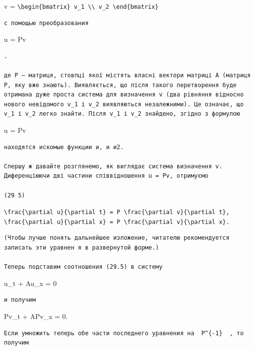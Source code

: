 \documentclass[
  ukrainian,
]{article}
\begin{document}
v =
\texttt{\textbackslash{}begin\{bmatrix\}\ v\_1\ \textbackslash{}\textbackslash{}\ v\_2\ \textbackslash{}end\{bmatrix\}}

\begin{verbatim}
с помощью преобразования
\end{verbatim}

u = Pv

\begin{verbatim}
.

де P — матриця, стовпці якої містять власні вектори матриці A (матриця P, яку вже знають). Виявляється, що після такого перетворення буде отримана дуже проста система для визначення v (два рівняння відносно нового невідомого v_1 і v_2 виявляються незалежними). Це означає, що v_1 і v_2 легко знайти. Після v_1 і v_2 знайдено, згідно з формулою
\end{verbatim}

u = Pv

\begin{verbatim}
находятся искомые функции и, и и2.

Спершу ж давайте розглянемо, як виглядає система визначення v. Диференціюючи дві частини співвідношення u = Pv, отримуємо

(29 5)
\end{verbatim}

\texttt{\textbackslash{}frac\{\textbackslash{}partial\ u\}\{\textbackslash{}partial\ t\}\ =\ P\ \textbackslash{}frac\{\textbackslash{}partial\ v\}\{\textbackslash{}partial\ t\},}
\texttt{\textbackslash{}frac\{\textbackslash{}partial\ u\}\{\textbackslash{}partial\ x\}\ =\ P\ \textbackslash{}frac\{\textbackslash{}partial\ v\}\{\textbackslash{}partial\ x\}.}

\begin{verbatim}
(Чтобы лучше понять дальнейшее изложение, читателю рекомендуется записать эти уравнен я в развернутой форме.)

Теперь подставим соотношения (29.5) в систему
\end{verbatim}

u\_t + Au\_x = 0

\begin{verbatim}
и получим
\end{verbatim}

Pv\_t + APv\_x = 0.

\begin{verbatim}
Если умножить теперь обе части последнего уравнения на  P^{-1}  , то получим
\end{verbatim}
\end{document}

